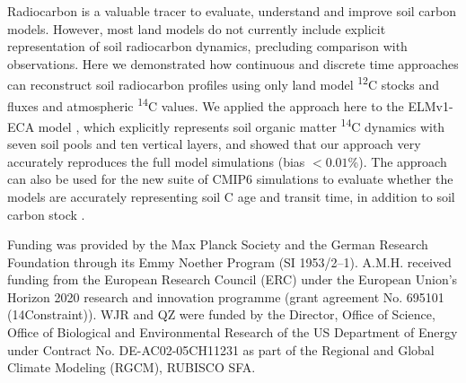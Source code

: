 \documentclass[draft]{agujournal2019}
\begin{document}
Radiocarbon is a valuable tracer to evaluate, understand and improve soil carbon models. However, most land models do not currently include explicit representation of soil radiocarbon dynamics, precluding comparison with observations. Here we demonstrated how continuous and discrete time approaches can reconstruct soil radiocarbon profiles using only land model \textsuperscript{12}C stocks and fluxes and atmospheric \textsuperscript{14}C values. We applied the approach here to the ELMv1-ECA model \cite{Zhu2019, Riley2018,Tang2018EI}, which explicitly represents soil organic matter \textsuperscript{14}C dynamics with seven soil pools and ten vertical layers, and showed that our approach very accurately reproduces the full model simulations (bias $<0.01$\%). The approach can also be used for the new suite of CMIP6 simulations to evaluate whether the models are accurately representing soil C age and transit time, in addition to soil carbon stock \cite{He2016, Lawrence2019}.

\acknowledgments
Funding was provided by the Max Planck Society and the German Research Foundation through its Emmy Noether Program (SI 1953/2--1). A.M.H. received funding from the European Research Council (ERC) under the European Union’s Horizon 2020 research and innovation programme (grant agreement No. 695101 (14Constraint)). WJR and QZ were funded by the Director, Office of Science, Office of Biological and Environmental Research of the US Department of Energy under Contract No. DE-AC02-05CH11231 as part of the Regional and Global Climate Modeling (RGCM), RUBISCO SFA.

%
%

\end{document}
